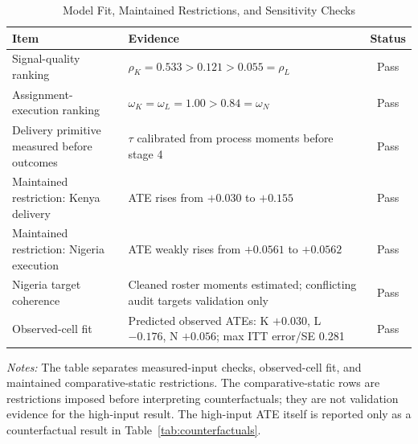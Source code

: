 \begin{table}[H]
\centering
\caption{Model Fit, Maintained Restrictions, and Sensitivity Checks}
\label{tab:struct_validation_checks}
\begin{threeparttable}
\footnotesize
\begin{tabular}[t]{>{\raggedright\arraybackslash}p{3.1cm}>{\raggedright\arraybackslash}p{8.0cm}c}
\toprule
Item & Evidence & Status \\
\midrule
Signal-quality ranking & $\rho_K=0.533>0.121>0.055=\rho_L$ & Pass \\
Assignment-execution ranking & $\omega_K=\omega_L=1.00>0.84=\omega_N$ & Pass \\
Delivery primitive measured before outcomes & $\tau$ calibrated from process moments before stage 4 & Pass \\
Maintained restriction: Kenya delivery & ATE rises from $+0.030$ to $+0.155$ & Pass \\
Maintained restriction: Nigeria execution & ATE weakly rises from $+0.0561$ to $+0.0562$ & Pass \\
Nigeria target coherence & Cleaned roster moments estimated; conflicting audit targets validation only & Pass \\
Observed-cell fit & Predicted observed ATEs: K $+0.030$, L $-0.176$, N $+0.056$; max ITT error/SE 0.281 & Pass \\
\bottomrule
\end{tabular}
\begin{tablenotes}
\footnotesize
\item \textit{Notes:} The table separates measured-input checks, observed-cell fit, and maintained comparative-static restrictions. The comparative-static rows are restrictions imposed before interpreting counterfactuals; they are not validation evidence for the high-input result. The high-input ATE itself is reported only as a counterfactual result in Table~\ref{tab:counterfactuals}.
\end{tablenotes}
\end{threeparttable}
\end{table}
